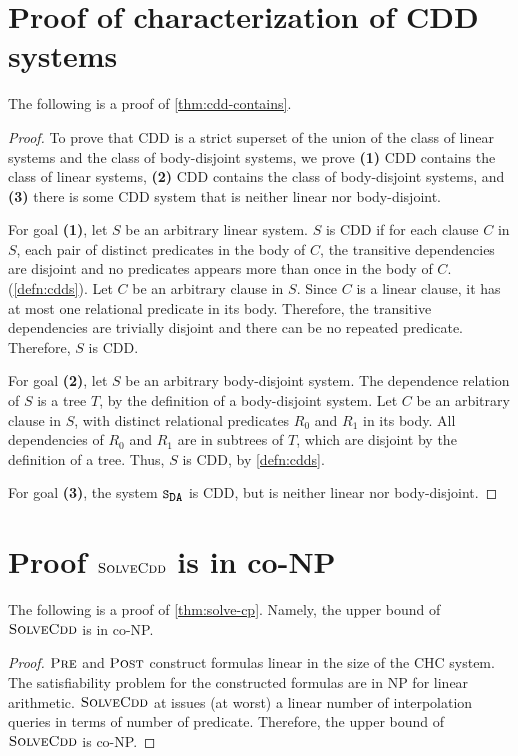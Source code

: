 \section{Proof of characterization of CDD systems}
\label{app:char}
The following is a proof of \autoref{thm:cdd-contains}.
%
\begin{proof}
  To prove that CDD is a strict superset of the union of the class
  of linear systems and the class of body-disjoint systems, we prove
  \textbf{(1)} CDD contains the class of linear systems,
  \textbf{(2)} CDD contains the class of body-disjoint systems, and
  \textbf{(3)} there is some CDD system that is neither linear nor
  body-disjoint.

  For goal \textbf{(1)}, let $S$ be an arbitrary linear
  system.
  $S$ is CDD if for each clause $C$ in
  $S$, each pair of distinct predicates in
  the body of $C$, the transitive dependencies are disjoint and
  no predicates appears more than once in the body of $C$.
  (\autoref{defn:cdds}).
  Let $C$ be an arbitrary clause in $S$.
  Since $C$ is a linear clause, it has at most one relational
  predicate in its body. Therefore, the transitive dependencies are
  trivially disjoint and there can be no repeated predicate.
  Therefore, $S$ is CDD.

  For goal \textbf{(2)}, let $S$ be an arbitrary
  body-disjoint system.
  The dependence relation of $S$ is a tree $T$, by the
  definition of a body-disjoint system.
  Let $C$ be an arbitrary clause in $S$, with
  distinct relational predicates $R_0$ and $R_1$ in its body.
  All dependencies of $R_0$ and $R_1$ are in subtrees of $T$, which
  are disjoint by the definition of a tree.
  Thus, $S$ is CDD, by \autoref{defn:cdds}.

  For goal \textbf{(3)}, the system $\mcchc$ is CDD, but is neither linear
  nor body-disjoint.
\end{proof}

\section{Proof $\textsc{SolveCdd}$ is in co-NP}
\label{app:solve-cp}
The following is a proof of \autoref{thm:solve-cp}.
%
Namely, the upper bound of $\textsc{SolveCdd}$ is in co-NP.
%
\begin{proof}
  $\textsc{Pre}$ and $\textsc{Post}$ construct formulas linear in the size of the
  CHC system. The satisfiability problem for the constructed formulas
  are in NP for linear arithmetic.
  $\textsc{SolveCdd}$ at issues (at worst) a linear number of interpolation
  queries in terms of number of predicate.
  Therefore, the upper bound of $\textsc{SolveCdd}$ is co-NP.
\end{proof}

